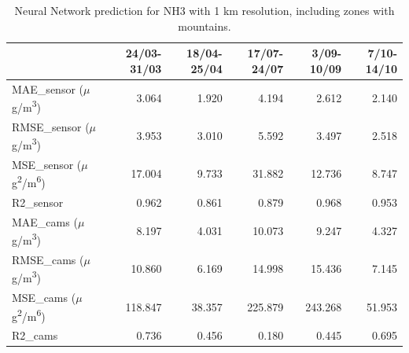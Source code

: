 \begin{table}[H]
\begin{tabular}{lrrrrr}
\toprule
 &  24/03-31/03 &  18/04-25/04 &  17/07-24/07 &  3/09-10/09 &  7/10-14/10 \\
\midrule
 MAE\_sensor ($\mu$g/m\textsuperscript{3})&        3.064 &        1.920 &        4.194 &       2.612 &       2.140 \\
RMSE\_sensor ($\mu$g/m\textsuperscript{3})&        3.953 &        3.010 &        5.592 &       3.497 &       2.518 \\
 MSE\_sensor ($\mu$g\textsuperscript{2}/m\textsuperscript{6})&       17.004 &        9.733 &       31.882 &      12.736 &       8.747 \\
  R2\_sensor &        0.962 &        0.861 &        0.879 &       0.968 &       0.953 \\
   MAE\_cams ($\mu$g/m\textsuperscript{3})&        8.197 &        4.031 &       10.073 &       9.247 &       4.327 \\
  RMSE\_cams ($\mu$g/m\textsuperscript{3})&       10.860 &        6.169 &       14.998 &      15.436 &       7.145 \\
   MSE\_cams ($\mu$g\textsuperscript{2}/m\textsuperscript{6})&      118.847 &       38.357 &      225.879 &     243.268 &      51.953 \\
    R2\_cams &        0.736 &        0.456 &        0.180 &       0.445 &       0.695 \\
\bottomrule
\end{tabular}
\caption{Neural Network prediction for NH3 with 1 km resolution, including zones with mountains.}
\end{table}


